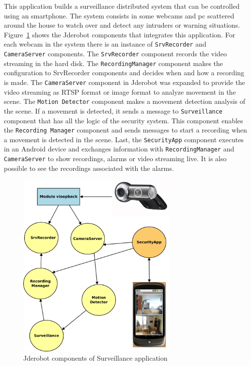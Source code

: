 \documentclass[twocolumn]{svjour3}          %
\begin{document}
This application builds a surveillance distributed system that can be controlled using an smartphone. The system consists in some webcams and pc scattered around the house to watch over and detect any intruders or warning situations. Figure~\ref{fig:surveillance1} shows the Jderobot components that integrates this application. For each
webcam in the system there is an instance of \texttt{SrvRecorder} and
\texttt{CameraServer} components. The \texttt{SrvRecorder} component records the video streaming in the hard disk. The
\texttt{RecordingManager} component makes the configuration to
{SrvRecorder} components and decides when and how a recording is
made. The \texttt{CameraServer} component in Jderobot was expanded to provide the video streaming as
RTSP format or image format to analyze movement in the scene. The \texttt{Motion Detector} component makes a movement detection analysis of the scene. If a movement is detected, it sends a message to \texttt{Surveillance} component that has all the logic of the security system. This component enables the \texttt{Recording Manager} component and sends messages to start a recording when a movement is detected in the scene. Last, the \texttt{SecurityApp} component executes in an Android device and exchanges information with \texttt{RecordingManager} and
\texttt{CameraServer} to show recordings, alarms or video streaming live. It is also possible to see the recordings associated with the alarms. 

\begin{figure}
\begin{center}
\includegraphics[width=8cm]{figs/surveillance-img1.png}
\caption{Jderobot components of Surveillance application}
\end{center}
\label{fig:surveillance1}
\end{figure}
\end{document}
